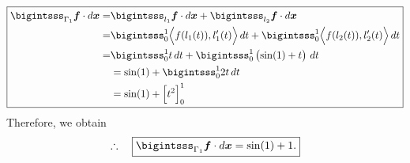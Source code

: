 \documentclass[12pt]{article}
\begin{document}
\begin{align*}
	\boxed{
		\begin{aligned}
			\bigintsss_{\Gamma_1} \Bf \cdot d\Bx
			= & \bigintsss_{l_1} \Bf \cdot d\Bx 
			+ \bigintsss_{l_2} \Bf \cdot d\Bx                                    \\
			= & \bigintsss_0^1 \Big\langle f(l_1(t)), l_1'(t) \Big\rangle \, dt 
			+ \bigintsss_0^1 \Big\langle f(l_2(t)), l_2'(t) \Big\rangle \, dt    \\
			= & \bigintsss_0^1 t  \, dt
			+ \bigintsss_0^1 \left( \sin(1) + t \right) \,  dt                   \\
			  & =  \sin(1) + \bigintsss_0^1 2t  \, dt                            \\
			  & =  \sin(1) + \Big[ t^2 \Big]_0^1
		\end{aligned}
	}
\end{align*}
Therefore, we obtain
\begin{align*}
	\therefore\quad\boxed{
		\bigintsss_{\Gamma_1} \Bf \cdot d\Bx =  \sin(1) + 1.
	}
\end{align*}
\clearpage
\end{document}
